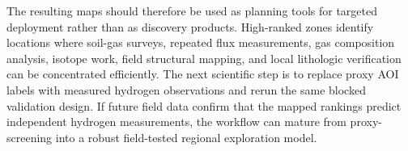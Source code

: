 \documentclass[numrefs]{interact}
\theoremstyle{plain}%
\theoremstyle{definition}
\theoremstyle{remark}
\begin{document}
The resulting maps should therefore be used as planning tools for targeted deployment rather than as discovery products. High-ranked zones identify locations where soil-gas surveys, repeated flux measurements, gas composition analysis, isotope work, field structural mapping, and local lithologic verification can be concentrated efficiently. The next scientific step is to replace proxy AOI labels with measured hydrogen observations and rerun the same blocked validation design. If future field data confirm that the mapped rankings predict independent hydrogen measurements, the workflow can mature from proxy-screening into a robust field-tested regional exploration model.



\end{document}
